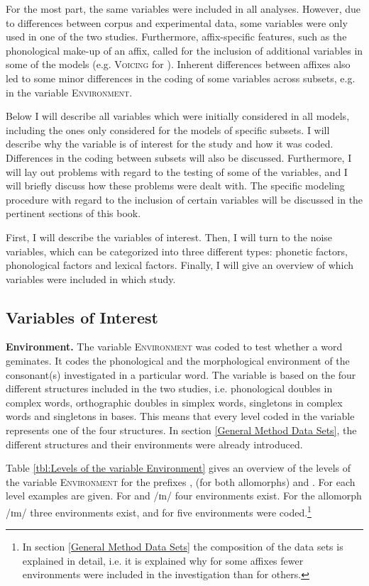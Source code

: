 For the most part, the same variables were included in all analyses. However, due to differences between corpus and experimental data, some variables were only used in one of the two studies. 
 Furthermore, affix-specific features, such as the phonological make-up of an affix, called for the inclusion of additional variables in some of the models (e.g. \textsc{Voicing} for ). Inherent differences between affixes also led to some minor differences in the coding of some variables across subsets, e.g. in the variable \textsc{Environment}. 
 
Below I will describe all variables which were initially considered in all models, including the ones only considered for the models of specific subsets. I will describe why the variable is of interest for the study and how it was coded. Differences in the coding between subsets will also be discussed. Furthermore, I will lay out  problems with regard to the testing of some of the variables, and I will briefly discuss how these problems were dealt with. The specific modeling procedure with regard to the inclusion of certain variables will be discussed in the pertinent sections of this book.


First, I will describe the variables of interest. Then, I will turn to the noise variables, which can be categorized  into three different types: phonetic factors, phonological factors and lexical factors.  Finally, I will give an overview of which variables were included in which study. 

\subsection{Variables of Interest} \label{variables of interest}

\textbf{Environment.}  The variable \textsc{Environment} was coded to test whether a word geminates. It codes the phonological and the morphological environment of the consonant(s) investigated in a particular word. The variable is based on the four different structures included in the two studies,  i.e. phonological doubles in complex words, orthographic doubles in simplex words, singletons in complex words and singletons in bases. This means that every level coded in the variable represents one of the four structures. In section \ref{General Method Data Sets}, the different structures and their environments were already introduced. %
 
 Table \ref{tbl:Levels of the variable Environment} gives an overview of the levels of the variable \textsc{Environment} for the prefixes ,  (for both allomorphs) and . For each level examples are given.
 For  and /ɪn/ four environments exist. For the allomorph /ɪm/ three environments exist, and for  five environments were coded.\footnote{In section \ref{General Method Data Sets} the composition of the data sets is explained in detail, i.e. it is explained why for some affixes fewer environments were included in the investigation than for others.}
 

